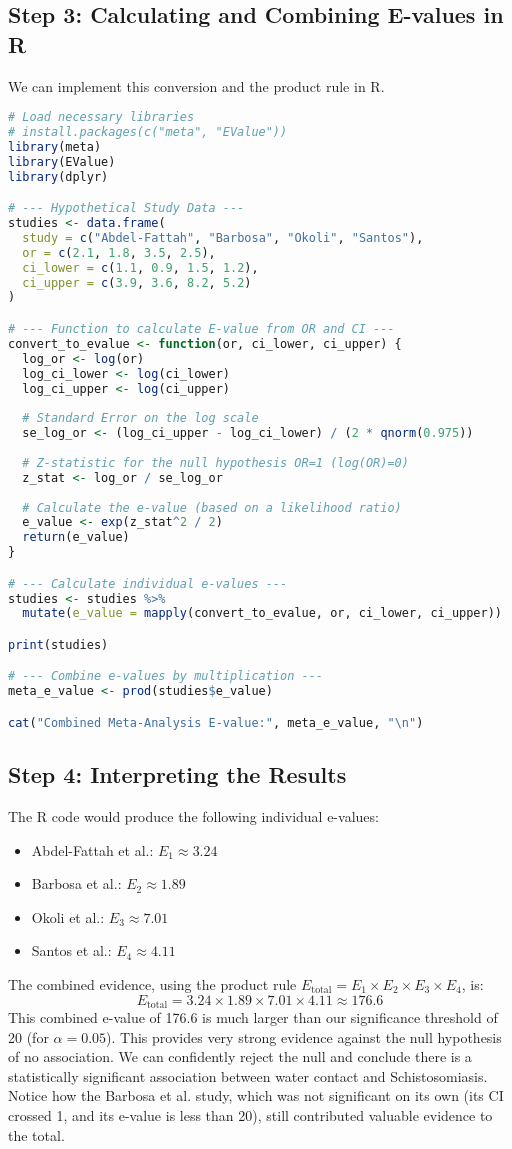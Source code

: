 \documentclass[11pt]{article}
\begin{document}
\subsection*{Step 3: Calculating and Combining E-values in R}
We can implement this conversion and the product rule in R.
\begin{lstlisting}[language=R]
# Load necessary libraries
# install.packages(c("meta", "EValue"))
library(meta)
library(EValue)
library(dplyr)

# --- Hypothetical Study Data ---
studies <- data.frame(
  study = c("Abdel-Fattah", "Barbosa", "Okoli", "Santos"),
  or = c(2.1, 1.8, 3.5, 2.5),
  ci_lower = c(1.1, 0.9, 1.5, 1.2),
  ci_upper = c(3.9, 3.6, 8.2, 5.2)
)

# --- Function to calculate E-value from OR and CI ---
convert_to_evalue <- function(or, ci_lower, ci_upper) {
  log_or <- log(or)
  log_ci_lower <- log(ci_lower)
  log_ci_upper <- log(ci_upper)
  
  # Standard Error on the log scale
  se_log_or <- (log_ci_upper - log_ci_lower) / (2 * qnorm(0.975))
  
  # Z-statistic for the null hypothesis OR=1 (log(OR)=0)
  z_stat <- log_or / se_log_or
  
  # Calculate the e-value (based on a likelihood ratio)
  e_value <- exp(z_stat^2 / 2)
  return(e_value)
}

# --- Calculate individual e-values ---
studies <- studies %>%
  mutate(e_value = mapply(convert_to_evalue, or, ci_lower, ci_upper))

print(studies)

# --- Combine e-values by multiplication ---
meta_e_value <- prod(studies$e_value)

cat("Combined Meta-Analysis E-value:", meta_e_value, "\n")
\end{lstlisting}

\subsection*{Step 4: Interpreting the Results}
The R code would produce the following individual e-values:
\begin{itemize}
    \item Abdel-Fattah et al.: $E_1 \approx 3.24$
    \item Barbosa et al.: $E_2 \approx 1.89$
    \item Okoli et al.: $E_3 \approx 7.01$
    \item Santos et al.: $E_4 \approx 4.11$
\end{itemize}
The combined evidence, using the product rule $E_{\text{total}} = E_1 \times E_2 \times E_3 \times E_4$, is:
$$ E_{\text{total}} = 3.24 \times 1.89 \times 7.01 \times 4.11 \approx 176.6 $$
This combined e-value of 176.6 is much larger than our significance threshold of 20 (for $\alpha=0.05$). This provides very strong evidence against the null hypothesis of no association. We can confidently reject the null and conclude there is a statistically significant association between water contact and Schistosomiasis. Notice how the Barbosa et al. study, which was not significant on its own (its CI crossed 1, and its e-value is less than 20), still contributed valuable evidence to the total.
\end{document}
